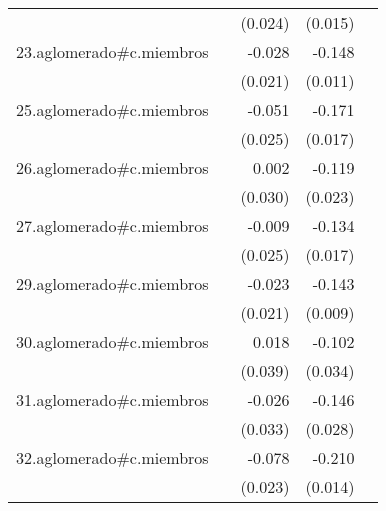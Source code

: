 {\begin{longtable}{l*{4}{D{.}{.}{-1}}}
            &                     &     (0.024)         &     (0.015)         &                     \\
\addlinespace
23.aglomerado#c.miembros&                     &      -0.028         &      -0.148\sym{***}&                     \\
            &                     &     (0.021)         &     (0.011)         &                     \\
\addlinespace
25.aglomerado#c.miembros&                     &      -0.051\sym{*}  &      -0.171\sym{***}&                     \\
            &                     &     (0.025)         &     (0.017)         &                     \\
\addlinespace
26.aglomerado#c.miembros&                     &       0.002         &      -0.119\sym{***}&                     \\
            &                     &     (0.030)         &     (0.023)         &                     \\
\addlinespace
27.aglomerado#c.miembros&                     &      -0.009         &      -0.134\sym{***}&                     \\
            &                     &     (0.025)         &     (0.017)         &                     \\
\addlinespace
29.aglomerado#c.miembros&                     &      -0.023         &      -0.143\sym{***}&                     \\
            &                     &     (0.021)         &     (0.009)         &                     \\
\addlinespace
30.aglomerado#c.miembros&                     &       0.018         &      -0.102\sym{**} &                     \\
            &                     &     (0.039)         &     (0.034)         &                     \\
\addlinespace
31.aglomerado#c.miembros&                     &      -0.026         &      -0.146\sym{***}&                     \\
            &                     &     (0.033)         &     (0.028)         &                     \\
\addlinespace
32.aglomerado#c.miembros&                     &      -0.078\sym{***}&      -0.210\sym{***}&                     \\
            &                     &     (0.023)         &     (0.014)         &                     \\

\end{longtable}}
